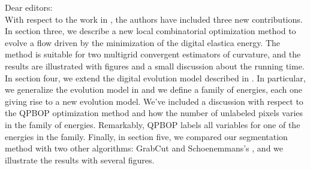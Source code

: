 \documentclass{article}
\begin{document}

Dear editors:\\

With respect to the work in \cite{antunes19}, the authors have included three new contributions. In section three, we describe a new local combinatorial optimization method to evolve a flow driven by the minimization of the digital elastica energy. The method is suitable for two multigrid convergent estimators of curvature, and the results are illustrated with figures and a small discussion about the running time. In section four, we extend the digital evolution model described in \cite{antunes19}. In particular, we generalize the evolution model in and we define a family of energies, each one giving rise to a new evolution model. We've included a discussion with respect to the QPBOP optimization method and how the number of unlabeled pixels varies in the family of energies. Remarkably, QPBOP labels all variables for one of the energies in the family. Finally, in section five, we compared our segmentation method with two other algorithms: GrabCut \cite{rother04grabcut} and Schoenemmans's \cite{schoenemann09linear}, and we illustrate the results with several figures. 




\end{document}

